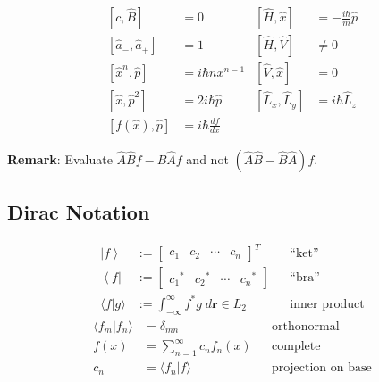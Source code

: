 \noindent\begin{align*}
    \left[c,\hat B\right]                        & =0                     & \left[\widehat{H},\widehat{x}\right]     & =-\frac{i\hbar}{m}\widehat{p} \\
    \left[\widehat{a}_{-},\widehat{a}_{+}\right] & = 1                    & \left[\widehat{H}, \widehat{V}\right]    & \neq 0                        \\
    \left[\widehat{x}^n,\widehat{p}\right]       & = i \hbar n x^{n-1}    & \left[\widehat{V},\widehat{x}\right]     & =0                            \\
    \left[\widehat{x},\widehat{p}^2\right]       & = 2i\hbar\widehat{p}   & \left[\widehat{L}_x,\widehat{L}_y\right] & =i\hbar\widehat{L}_z          \\
    \left[f(\widehat{x}),\widehat{p}\right]      & = i \hbar\frac{df}{dx} &                                          &
\end{align*}

\textbf{Remark}: Evaluate $\widehat{A}\widehat{B}f - \widehat{B}\widehat{A}f$ and not $(\widehat{A}\widehat{B} - \widehat{B}\widehat{A})f$.


\subsection{Dirac Notation}
\noindent\begin{align*}
    \left|f\right\rangle  & := \begin{bmatrix}
                                   c_1 & c_2 & \cdots & c_n
                               \end{bmatrix}^T                               &  & \text{``ket''}              \\
    \left\langle f\right| & := \begin{bmatrix}
                                   {c_1}^* & {c_2}^* & \cdots & {c_n}^*
                               \end{bmatrix}                   &  & \text{``bra''}                            \\
    \langle f|g \rangle   & := \int_{-\infty}^{\infty} f^* g\; d \mathbf{r} \in L_2 &  & \text{inner product}
\end{align*}
\noindent\begin{align*}
    \langle f_m|f_n \rangle & = \delta_{mn}                    &  & \text{orthonormal}        \\
    f(x)                    & = \sum_{n=1}^{\infty} c_n f_n(x) &  & \text{complete}           \\
    c_n                     & = \langle f_n|f \rangle          &  & \text{projection on base}
\end{align*}

